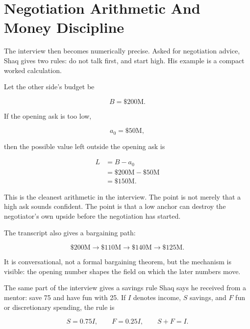 \section{Negotiation Arithmetic And Money Discipline}

The interview then becomes numerically precise. Asked for negotiation advice, Shaq gives two rules: do not talk first, and start high. His example is a compact worked calculation.

Let the other side's budget be

\begin{equation}
B = \$200\mathrm{M}.
\end{equation}

If the opening ask is too low,

\begin{equation}
a_0 = \$50\mathrm{M},
\end{equation}

then the possible value left outside the opening ask is

\begin{align}
L
&= B-a_0 \\
&= \$200\mathrm{M}-\$50\mathrm{M} \\
&= \$150\mathrm{M}.
\end{align}

This is the cleanest arithmetic in the interview. The point is not merely that a high ask sounds confident. The point is that a low anchor can destroy the negotiator's own upside before the negotiation has started.

The transcript also gives a bargaining path:

\begin{equation}
\$200\mathrm{M}
\rightarrow
\$110\mathrm{M}
\rightarrow
\$140\mathrm{M}
\rightarrow
\$125\mathrm{M}.
\end{equation}

It is conversational, not a formal bargaining theorem, but the mechanism is visible: the opening number shapes the field on which the later numbers move.

The same part of the interview gives a savings rule Shaq says he received from a mentor: save 75 and have fun with 25. If \(I\) denotes income, \(S\) savings, and \(F\) fun or discretionary spending, the rule is

\begin{equation}
S = 0.75I,
\qquad
F = 0.25I,
\qquad
S+F=I.
\end{equation}

